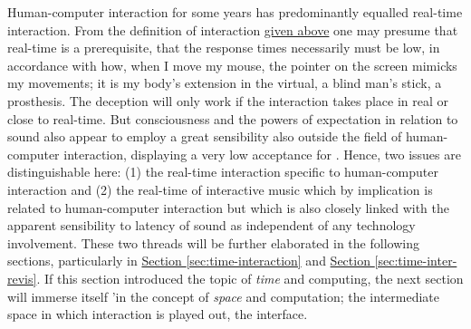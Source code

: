 Human-computer interaction for some years has predominantly equalled real-time interaction. From the definition of interaction \hyperref[interaction:item:2]{given above} one may presume that real-time is a prerequisite, that the response times necessarily must be low, in accordance with how, when I move my mouse, the pointer on the screen mimicks my movements; it is my body's extension in the virtual, a blind man's stick, a prosthesis. The deception will only work if the interaction takes place in real or close to real-time. But consciousness and the powers of expectation in relation to sound also appear to employ a great sensibility also outside the field of human-computer interaction, displaying a very low acceptance for \emph{}. Hence, two issues are distinguishable here: (1) the real-time interaction specific to human-computer interaction and (2) the real-time of interactive music which by implication is related to human-computer interaction but which is also closely linked with the apparent sensibility to latency of sound as independent of any technology involvement. These two threads will be further elaborated in the following sections, particularly in \hyperlink{sec:human-comp-inter:7}{Section \ref*{sec:time-interaction}} and \hyperlink{sec:target:time-inter-revis}{Section \ref*{sec:time-inter-revis}}. If this section introduced the topic of \emph{time} and computing, the next section will immerse itself 'in the concept of \emph{space} and computation; the intermediate space in which interaction is played out, the interface.

